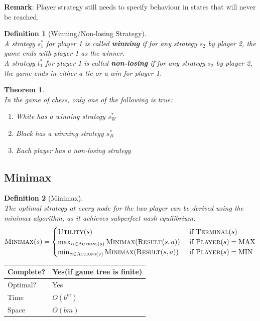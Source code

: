 \documentclass[12pt]{article}
\newtheorem{definition}{Definition}[section]
\newtheorem{theorem}{Theorem}[section]
\theoremstyle{definition}
\begin{document}
\textbf{Remark}: Player strategy still needs to specify behaviour in states that will never be reached.
\begin{definition}[Winning/Non-losing Strategy]
\hfill\\\normalfont A strategy $s_1^\ast$ for player 1 is called \textbf{winning} if for any strategy $s_2$ by player 2, the game ends with player 1 as the winner.\\
A strategy $t_1^\ast$ for player 1 is called \textbf{non-losing} if for any strategy $s_2$ by player 2, the game ends in either a tie or a win for player 1.
\end{definition}
\begin{theorem}
\hfill\\\normalfont In the game of chess, only one of the following is true:
\begin{enumerate}
	\item White has a winning strategy $s_W^\ast$
	\item Black has a winning strategy $s_B^\ast$
	\item Each player has a non-losing strategy
\end{enumerate}
\end{theorem}
\subsection{Minimax}
\begin{definition}[Minimax]
\hfill\\\normalfont The optimal strategy at every node for the two player can be derived using the minimax algorithm, as it achieves subperfect nash equilibrium.
\[
\textsc{Minimax}(s)=\begin{cases}
\textsc{Utility}(s)&\text{ if }\textsc{Terminal}(s)\\
\max_{\alpha\in\textsc{Actions}(s)}\textsc{Minimax}(\textsc{Result}(s,a))&\text{ if }\textsc{Player}(s)=\text{MAX}\\
\min_{\alpha\in\textsc{Actions}(s)}\textsc{Minimax}(\textsc{Result}(s,a))&\text{ if }\textsc{Player}(s)=\text{MIN}
\end{cases}
\]
\end{definition}
\begin{table}[h]
\centering
\begin{tabular}{|l|l|}
\hline
Complete?&Yes(if game tree is finite)\\\hline
Optimal?&Yes\\\hline
Time&$O(b^m)$\\\hline
Space&$O(bm)$\\\hline
\end{tabular}
\end{table}
\end{document}
